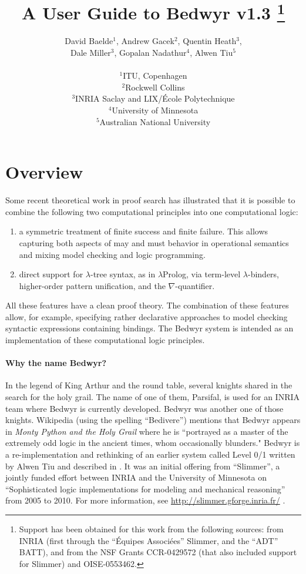 \documentclass{article}
\title{{\Huge A User Guide to Bedwyr v1.3}
   \thanks{Support has been obtained for this work from the following
           sources: from INRIA (first through the ``\'Equipes
           Associ{\'e}es'' Slimmer, and the ``ADT'' BATT),
           and from the NSF Grants CCR-0429572 (that also included
           support for Slimmer) and OISE-0553462.}
}
\author{David Baelde$^1$,
        Andrew Gacek$^2$,
        Quentin Heath$^3$, \\
        Dale Miller$^3$,
        Gopalan Nadathur$^4$,
        Alwen Tiu$^5$ \\ \\
$^1$ITU, Copenhagen\\
$^2$Rockwell Collins\\
$^3$INRIA Saclay and LIX/\'Ecole Polytechnique\\
$^4$University of Minnesota\\
$^5$Australian National University
}
\newcommand{\lp}{$\lambda$Prolog}
\begin{document}
\maketitle
\tableofcontents
\newpage

\section{Overview}

Some recent theoretical work in proof search has illustrated that it
is possible to combine the following two computational principles into
one computational logic:
\begin{enumerate}
  \item a symmetric treatment of finite success and finite failure.
    This allows capturing both aspects of may and must behavior in
    operational semantics and mixing model checking and logic programming.

  \item direct support for $\lambda$-tree syntax, as in \lp{},
    via term-level $\lambda$-binders, higher-order pattern
    unification, and the $\nabla$-quantifier.
\end{enumerate}
All these features have a clean proof theory.  The combination of
these features allow, for example, specifying rather declarative
approaches to model checking syntactic expressions containing
bindings.  The Bedwyr system is intended as an implementation of these
computational logic principles.

\paragraph{Why the name Bedwyr?}
In the legend of King Arthur and the round table, several knights
shared in the search for the holy grail.  The name of one of them,
Parsifal, is used for an INRIA team where Bedwyr is currently
developed. Bedwyr was another one of those knights.  Wikipedia (using
the spelling ``Bedivere'') mentions that Bedwyr appears in {\em Monty
Python and the Holy Grail} where he is ``portrayed as a master of the
extremely odd logic in the ancient times, whom occasionally blunders."
Bedwyr is a re-implementation and rethinking of an earlier system
called Level 0/1 written by Alwen Tiu and described in
\cite{tiu05eshol}. It was an initial offering from ``Slimmer'', a
jointly funded effort between INRIA and the University of Minnesota on
``Sophisticated logic implementations for modeling and mechanical
reasoning'' from 2005 to 2010. For more information, see
\urldef{\thisurl}\url{http://slimmer.gforge.inria.fr/}
\ahrefurl{\thisurl}.
\end{document}
